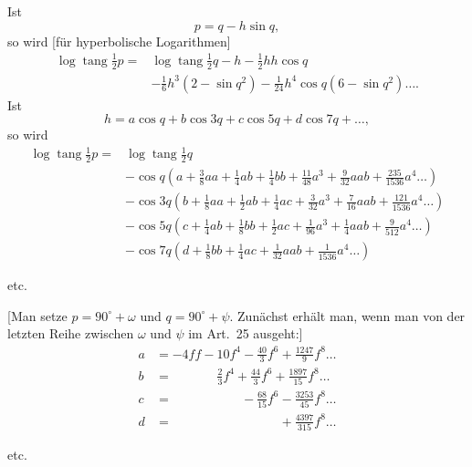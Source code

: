 \bigskip
{\centering [31.]\par{}\par}
Ist
\[p=q-h\sin q,\]
\noindent so wird [für hyperbolische Logarithmen]
\[
\begin{aligned}
\log\operatorname{tang}\tfrac12p={}&\log\operatorname{tang}\tfrac12q-h-\tfrac12hh\cos q\\
&-\tfrac16h^3(2-\sin q^2)-\tfrac1{24}h^4\cos q(6-\sin q^2)\ldots.
\end{aligned}
\]
Ist
\[h=a\cos q+b\cos3q+c\cos5q+d\cos7q+\ldots,\]
\noindent so wird
\[
\begin{aligned}
\log\operatorname{tang}\tfrac12p={}&\log\operatorname{tang}\tfrac12q\\
&-\cos q\left(a+\tfrac38aa+\tfrac14ab+\tfrac14bb+\tfrac{11}{48}a^3+\tfrac9{32}aab+\tfrac{235}{1536}a^4\ldots\right)\\
&-\cos3q\left(b+\tfrac18aa+\tfrac12ab+\tfrac14ac+\tfrac3{32}a^3+\tfrac7{16}aab+\tfrac{121}{1536}a^4\ldots\right)\\
&-\cos5q\left(c+\tfrac14ab+\tfrac18bb+\tfrac12ac+\tfrac1{96}a^3+\tfrac14aab+\tfrac9{512}a^4\ldots\right)\\
&-\cos7q\left(d+\tfrac18bb+\tfrac14ac+\tfrac1{32}aab+\tfrac1{1536}a^4\ldots\right)
\end{aligned}
\]
{\centering etc.\par}
[Man setze \(p=90^\circ+\omega\) und \(q=90^\circ+\psi\). Zunächst erhält man, wenn man von der letzten Reihe zwischen \(\omega\) und \(\psi\) im Art.~25 ausgeht:]
\[
\begin{aligned}
a&=-4ff-10f^4-\frac{40}{3}f^6+\frac{1247}{9}f^8\ldots\\
b&=\phantom{-4ff-}\frac23f^4+\frac{44}{3}f^6+\frac{1897}{15}f^8\ldots\\
c&=\phantom{-4ff-10f^4}-\frac{68}{15}f^6-\frac{3253}{45}f^8\ldots\\
d&=\phantom{-4ff-10f^4-\frac{40}{3}f^6}+\frac{4397}{315}f^8\ldots
\end{aligned}
\]
{\centering etc.\par}
